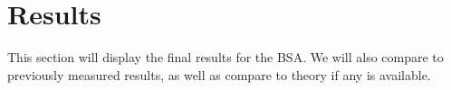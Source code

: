 \section{Results}
This section will display the final results for the BSA.  We will also compare to previously measured results, as well as compare to theory if any is available.